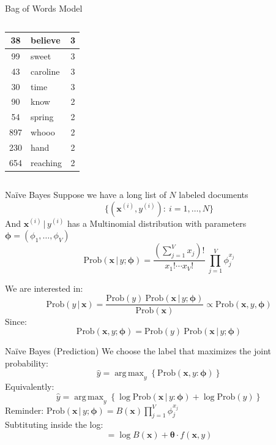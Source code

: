 \documentclass{beamer}
\newcommand{\Prob}{\text{Prob}}
\newcommand{\bx}{\mathbf{x}}
\newcommand{\bphi}{\pmb{\phi}}
\newcommand{\btheta}{\pmb{\theta}}
\newcommand{\given}{\, | \,}
\DeclareMathOperator*{\argmax}{arg\,max}
\begin{document}
\begin{frame}{Bag of Words Model}
\begin{columns}[T]
\begin{column}{0.4\textwidth}
\begin{tabular}{|c|l|c|}
                \hline
                38 & believe&3\\
                \hline
                99 & sweet&3\\
                \hline
                43 & caroline&3\\
                \hline
                30 & time&3\\
                \hline
                90 &know&2\\
                \hline
                54& spring&2\\
                \hline
                897& whooo&2\\
                \hline
                230 & hand&2\\
                \hline
                654 & reaching&2\\
                \hline
            \end{tabular}
        \end{column}
    \end{columns}
\end{frame}

\begin{frame}{Na\"ive Bayes}
    Suppose we have a long list of $N$ labeled documents $$\{(\bx^{(i)},y^{(i)}) :\ i = 1,\ldots, N \}$$
        And $\bx^{(i)}\given y^{(i)} $ has a Multinomial distribution with parameters $\bphi = (\phi_1,\ldots, \phi_V)$ 
        $$\Prob(\bx\given y;\bphi) = \frac{(\sum_{j=1}^V x_j)!}{x_1!\cdots x_V!}\  \prod_{j=1}^V \phi_j^{x_j}$$

        We are interested in:
        $$\Prob(y\given \bx) = \frac{\Prob(y)\  \Prob(\bx \given y; \bphi)}{\Prob(\bx)}\propto \Prob(\bx, y,\bphi)$$
        Since:
        $$\Prob(\bx,y; \bphi) = \Prob(y) \ \Prob(\bx \given y; \bphi)$$

\end{frame}


\begin{frame}{Na\"ive Bayes (Prediction)}
     We choose the label that maximizes the joint probability:
     $$\hat y = \argmax_y\left\{ \Prob(\bx, y: \bphi)\right \}$$
     Equivalently:
     $$\hat y = \argmax_y\left\{ \log \Prob(\bx\given y: \bphi) + \log\Prob(y)\right\}$$
     {\color{green}Reminder:} $\displaystyle \Prob(\bx\given y;\bphi) = B(\bx) \prod_{j=1}^V \phi_j^{x_j}$\\
     Subtituting inside the log:
     $$= \log B(\bx) + \btheta\cdot f(\bx, y)$$
     
\end{frame}
\end{document}
